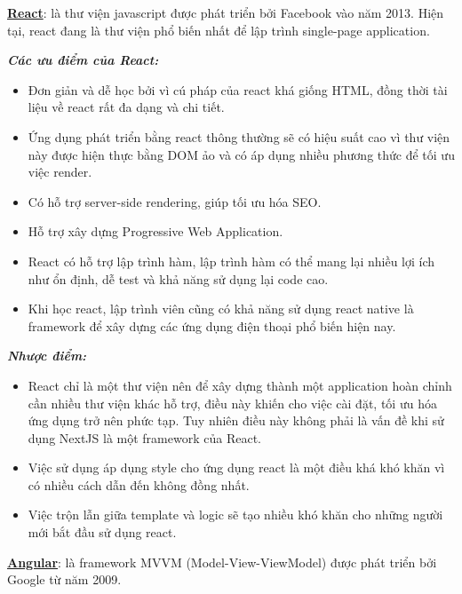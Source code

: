 \documentclass[12pt,a4paper]{article}
\begin{document}
    \textbf{\underline{React}}: là thư viện javascript được phát triển bởi Facebook vào năm 2013. Hiện tại, react đang là thư viện phổ biến nhất để lập trình single-page application.

    \textbf{\textit{Các ưu điểm của React:}}
    \begin{itemize}
        \item Đơn giản và dễ học bởi vì cú pháp của react khá giống HTML, đồng thời tài liệu về react rất đa dạng và chi tiết.
        \item Ứng dụng phát triển bằng react thông thường sẽ có hiệu suất cao vì thư viện này được hiện thực bằng DOM ảo và có áp dụng nhiều phương thức để tối ưu việc render.
        \item  Có hỗ trợ server-side rendering, giúp tối ưu hóa SEO.
        \item Hỗ trợ xây dựng Progressive Web Application.
        \item React có hỗ trợ lập trình hàm, lập trình hàm có thể mang lại nhiều lợi ích như ổn định, dễ test và khả năng sử dụng lại code cao.
        \item Khi học react, lập trình viên cũng có khả năng sử dụng react native là framework để xây dựng các ứng dụng điện thoại phổ biến hiện nay.
    \end{itemize}

    \textbf{\textit{Nhược điểm:}}
    \begin{itemize}
        \item React chỉ là một thư viện nên để xây dựng thành một application hoàn chỉnh cần nhiều thư viện khác hỗ trợ, điều này khiến cho việc cài đặt, tối ưu hóa ứng dụng trở nên phức tạp. Tuy nhiên điều này không phải là vấn đề khi sử dụng NextJS là một framework của React.
        \item Việc sử dụng áp dụng style cho ứng dụng react là một điều khá khó khăn vì có nhiều cách dẫn đến không đồng nhất.
        \item  Việc trộn lẫn giữa template và logic sẽ tạo nhiều khó khăn cho những người mới bắt đầu sử dụng react.
    \end{itemize}

    \textbf{\underline{Angular}}: là framework MVVM (Model-View-ViewModel) được phát triển bởi Google từ năm 2009.
\end{document}
